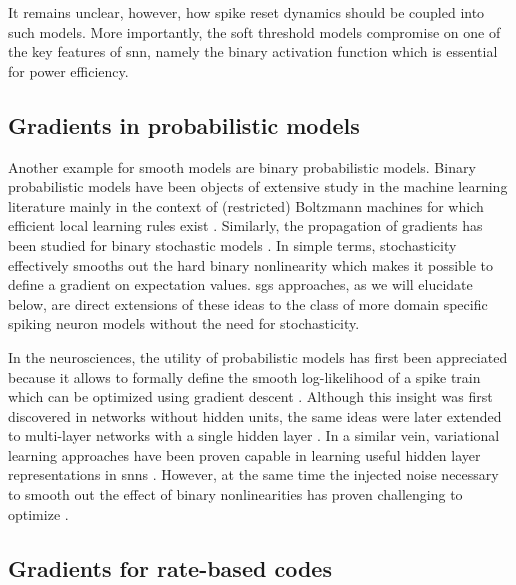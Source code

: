 \documentclass[journal,onecolumn,11pt]{IEEEtran}
\begin{document}
It remains unclear, however, how spike reset dynamics should be coupled into
such models. More importantly, the soft threshold models compromise on one of
the key features of \gls{snn}, namely the binary activation function which is
essential for power efficiency.


\subsection{Gradients in probabilistic models}

Another example for smooth models are binary probabilistic models. 
Binary probabilistic models have been objects of extensive study in the machine
learning literature mainly in the context of (restricted) Boltzmann machines
for which efficient local learning rules exist \cite{ackley_learning_1985}. 
Similarly, the propagation of gradients has been studied for binary stochastic
models \cite{bengio_estimating_2013}. 
In simple terms, stochasticity effectively smooths out the hard binary
nonlinearity which makes it possible to define a gradient on expectation values.
\glspl{sg} approaches, as we will elucidate below, are direct extensions of
these ideas to the class of more domain specific spiking neuron models without
the need for stochasticity.  

In the neurosciences, the utility of probabilistic models 
has first been appreciated because it allows to formally define the smooth
log-likelihood of a spike train which can be optimized using gradient descent
\cite{pfister_optimal_2006}.
Although this insight was first discovered in networks without hidden units,
the same ideas were later extended to multi-layer networks with a single hidden
layer \cite{gardner_learning_2015}.
In a similar vein, variational learning approaches have been proven capable
in learning useful hidden layer representations in \glspl{snn}
\cite{brea_matching_2013, rezende_stochastic_2014,Mostafa_Cauwenberghs18}.
However, at the same time the injected noise necessary to smooth out the effect
of binary nonlinearities has proven challenging to optimize
\cite{rezende_stochastic_2014}.


\subsection{Gradients for rate-based codes}
\end{document}
